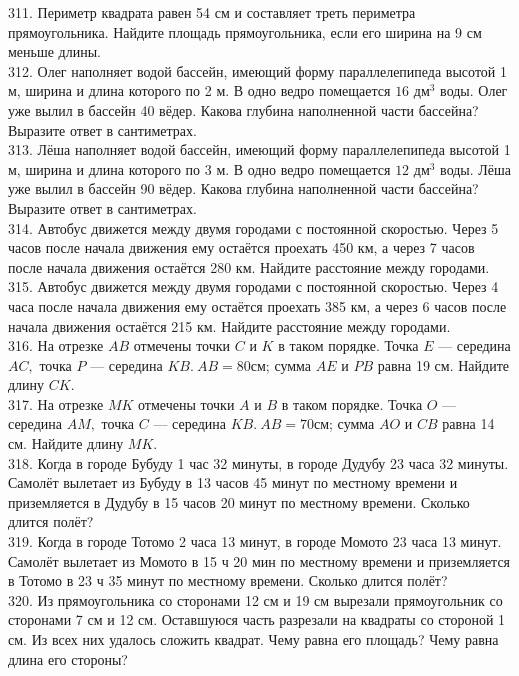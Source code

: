 311. Периметр квадрата равен 54 см и составляет треть периметра прямоугольника. Найдите площадь прямоугольника, если его ширина на 9 см меньше длины.\\
312. Олег наполняет водой бассейн, имеющий форму параллелепипеда высотой 1 м, ширина и длина которого по 2 м. В одно ведро помещается $16\text{ дм}^3$ воды. Олег уже вылил в бассейн 40 вёдер. Какова глубина наполненной части бассейна? Выразите ответ в сантиметрах.\\
313. Лёша наполняет водой бассейн, имеющий форму параллелепипеда высотой 1 м, ширина и длина которого по 3 м. В одно ведро помещается $12\text{ дм}^3$ воды. Лёша уже вылил в бассейн 90 вёдер. Какова глубина наполненной части бассейна? Выразите ответ в сантиметрах.\\
314. Автобус движется между двумя городами с постоянной скоростью. Через 5 часов после начала движения ему остаётся проехать 450 км, а через 7 часов после начала движения остаётся 280 км. Найдите расстояние между городами.\\
315. Автобус движется между двумя городами с постоянной скоростью. Через 4 часа после начала движения ему остаётся проехать 385 км, а через 6 часов после начала движения остаётся 215 км. Найдите расстояние между городами.\\
316. На отрезке $AB$ отмечены точки $C$ и $K$ в таком порядке. Точка $E$ --- середина $AC,$ точка $P$ --- середина $KB.\ AB = 80$см; сумма $AE$ и $PB$ равна 19 см. Найдите длину $CK.$\\
317. На отрезке $MK$ отмечены точки $A$ и $B$ в таком порядке. Точка $O$ --- середина $AM,$ точка $C$ --- середина $KB.\ AB = 70$см; сумма $AO$ и $CB$ равна 14 см. Найдите длину $MK.$\\
318. Когда в городе Бубуду 1 час 32 минуты, в городе Дудубу 23 часа 32 минуты. Самолёт вылетает из Бубуду в 13 часов 45 минут по местному времени и приземляется в
Дудубу в 15 часов 20 минут по местному времени. Сколько длится полёт?\\
319. Когда в городе Тотомо 2 часа 13 минут, в городе Момото 23 часа 13 минут. Самолёт вылетает из Момото в 15 ч 20 мин по местному времени и приземляется в Тотомо в
23 ч 35 минут по местному времени. Сколько длится полёт?\\
320. Из прямоугольника со сторонами 12 см и 19 см вырезали прямоугольник со сторонами 7 см и 12 см. Оставшуюся часть разрезали на квадраты со стороной 1 см. Из всех них удалось сложить квадрат. Чему равна его площадь? Чему равна длина его стороны?\\
